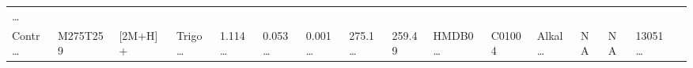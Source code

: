 \documentclass[
]{article}
\begin{document}
\begin{longtable}[]{@{}llllllllllllllll@{}}
\begin{minipage}[t]{0.02\columnwidth}
\ldots{}\strut
\end{minipage}\tabularnewline
\begin{minipage}[t]{0.04\columnwidth}\raggedright
Contr\ldots{}\strut
\end{minipage} & \begin{minipage}[t]{0.04\columnwidth}\raggedright
M275T259\strut
\end{minipage} & \begin{minipage}[t]{0.04\columnwidth}\raggedright
{[}2M+H{]}+\strut
\end{minipage} & \begin{minipage}[t]{0.04\columnwidth}\raggedright
Trigo\ldots{}\strut
\end{minipage} & \begin{minipage}[t]{0.04\columnwidth}\raggedright
1.114\ldots{}\strut
\end{minipage} & \begin{minipage}[t]{0.04\columnwidth}\raggedright
0.053\ldots{}\strut
\end{minipage} & \begin{minipage}[t]{0.04\columnwidth}\raggedright
0.001\ldots{}\strut
\end{minipage} & \begin{minipage}[t]{0.04\columnwidth}\raggedright
275.1\ldots{}\strut
\end{minipage} & \begin{minipage}[t]{0.04\columnwidth}\raggedright
259.49\strut
\end{minipage} & \begin{minipage}[t]{0.04\columnwidth}\raggedright
HMDB0\ldots{}\strut
\end{minipage} & \begin{minipage}[t]{0.03\columnwidth}\raggedright
C01004\strut
\end{minipage} & \begin{minipage}[t]{0.04\columnwidth}\raggedright
Alkal\ldots{}\strut
\end{minipage} & \begin{minipage}[t]{0.04\columnwidth}\raggedright
NA\strut
\end{minipage} & \begin{minipage}[t]{0.04\columnwidth}\raggedright
NA\strut
\end{minipage} & \begin{minipage}[t]{0.04\columnwidth}\raggedright
13051\ldots{}\strut
\end{minipage} & \begin{minipage}[t]{0.02\columnwidth}\raggedright

\end{minipage}
\end{longtable}
\end{document}
